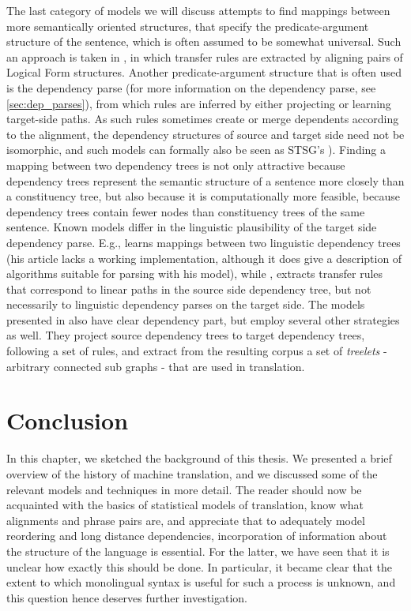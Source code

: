 The last category of models we will discuss attempts to find mappings between more semantically oriented structures, that specify the predicate-argument structure of the sentence, which is often assumed to be somewhat universal. Such an approach is taken in \cite{menezes2003best}, in which transfer rules are extracted by aligning pairs of Logical Form structures. Another predicate-argument structure that is often used is the dependency parse (for more information on the dependency parse, see \ref{sec:dep_parses}), from which rules are inferred by either projecting or learning target-side paths. As such rules sometimes create or merge dependents according to the alignment, the dependency structures of source and target side need not be isomorphic, and such models can formally also be seen as STSG's \citep[as made explicit in][]{eisner2003learning}). Finding a mapping between two dependency trees is not only attractive because dependency trees represent the semantic structure of a sentence more closely than a constituency tree, but also because it is computationally more feasible, because dependency trees contain fewer nodes than constituency trees of the same sentence. Known models differ in the linguistic plausibility of the target side dependency parse. E.g., \cite{eisner2003learning} learns mappings between two linguistic dependency trees (his article lacks a working implementation, although it does give a description of algorithms suitable for parsing with his model), while \cite{lin2004path}, extracts transfer rules that correspond to linear paths in the source side dependency tree, but not necessarily to linguistic dependency parses on the target side. The models presented in \cite{quirk2005dependency,quirk2006dependency,quirk2006we} also have clear dependency part, but employ several other strategies as well. They project source dependency trees to target dependency trees, following a set of rules, and extract from the resulting corpus a set of \textit{treelets} - arbitrary connected sub graphs - that are used in translation.

\section{Conclusion}
\label{sec:conclusion}

In this chapter, we sketched the background of this thesis. We presented a brief overview of the history of machine translation, and we discussed some of the relevant models and techniques in more detail. The reader should now be acquainted with the basics of statistical models of translation, know what alignments and phrase pairs are, and appreciate that to adequately model reordering and long distance dependencies, incorporation of information about the structure of the language is essential. For the latter, we have seen that it is unclear how exactly this should be done. In particular, it became clear that the extent to which monolingual syntax is useful for such a process is unknown, and this question hence deserves further investigation.